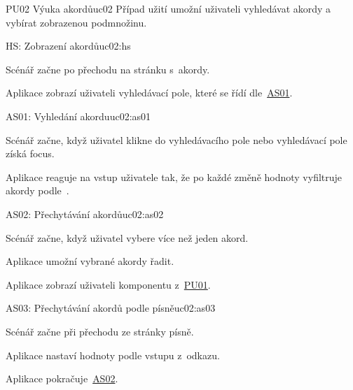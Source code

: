 \begin{usecase}{PU02 Výuka akordů}{uc02}
    Případ užití umožní uživateli vyhledávat akordy a vybírat zobrazenou podmnožinu.

    \begin{scenario}{HS: Zobrazení akordů}{uc02:hs}
        \item Scénář začne po přechodu na stránku s~akordy.
        \item Aplikace zobrazí uživateli vyhledávací pole, které se řídí dle~\hyperref[uc02:as01]{AS01}.
    \end{scenario}

    \begin{scenario}{AS01: Vyhledání akordu}{uc02:as01}
        \item Scénář začne, když uživatel klikne do vyhledávacího pole nebo vyhledávací pole získá focus.
        \item Aplikace reaguje na vstup uživatele tak, že po každé změně hodnoty vyfiltruje akordy podle~.
    \end{scenario}

    \begin{scenario}{AS02: Přechytávání akordů}{uc02:as02}
        \item Scénář začne, když uživatel vybere více než jeden akord.
        \item Aplikace umožní vybrané akordy řadit.
        \item Aplikace zobrazí uživateli komponentu z~\hyperref[uc01]{PU01}.
    \end{scenario}

    \begin{scenario}{AS03: Přechytávání akordů podle písně}{uc02:as03}
        \item Scénář začne při přechodu ze stránky písně.
        \item Aplikace nastaví hodnoty podle vstupu z~odkazu.
        \item Aplikace pokračuje~\hyperref[uc02:as02]{AS02}.
    \end{scenario}



\end{usecase}
